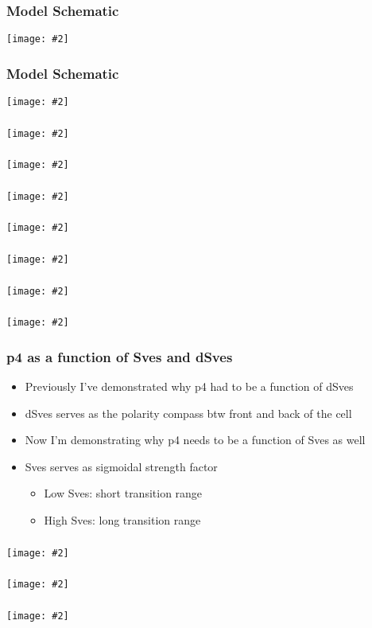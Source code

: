 \documentclass{beamer}
\newcommand{\plotslide}[2]{
  \begin{frame}
    \frametitle{#1}
    \centering
    \texttt{[image: \#2]}
  \end{frame}
}
\begin{document}
\plotslide{Model Schematic}{../tikz/flow.pdf}

\iffalse
\plotslide{Constant p4}{constant_p4_func.pdf}
\plotslide{Constant p4}{p4a_sign_change_Sves.pdf}
\plotslide{Constant p4}{p4a_sign_change_MI.pdf}

\begin{frame}
  \frametitle{Constant p4}
  \begin{itemize}
    \item Positive amp is good for native
    \item Negative amp is good for overexpressed
    \item Smoothly change amp w.r.t expression level
  \end{itemize}
\end{frame}

\plotslide{Coupled p4}{coupled_p4_func.pdf}
\plotslide{Coupled p4}{Sves_coupled_p4.pdf}
\plotslide{Coupled p4}{MI_coupled_p4.pdf}

\fi


\plotslide{Model Schematic}{../tikz/flow_stot.pdf}
\plotslide{}{StotVsMAPKpp.pdf}

\plotslide{}{SmemVsp3.pdf}


\plotslide{}{p3effects.pdf}
\plotslide{}{p3effects_Constant.pdf}
\plotslide{}{p3effects_Rising.pdf}
\plotslide{}{p3effects_Falling.pdf}
\plotslide{}{p3effects_Bell.pdf}

\begin{frame}
  \frametitle{p4 as a function of Sves and dSves}
  \begin{itemize}
    \itemsep3em
    \item Previously I've demonstrated why p4 had to be a function of dSves
    \item dSves serves as the polarity compass btw front and back of the cell
    \item Now I'm demonstrating why p4 needs to be a function of Sves as
      well
    \item Sves serves as sigmoidal strength factor
      \begin{itemize}
          \item Low Sves: short transition range
          \item High Sves: long transition range
      \end{itemize}
  \end{itemize}
\end{frame}
\plotslide{}{fig-p4func.pdf}
\plotslide{}{fig-p4func3D_0.pdf}
\plotslide{}{fig-p4func3D_1.pdf}
\end{document}
